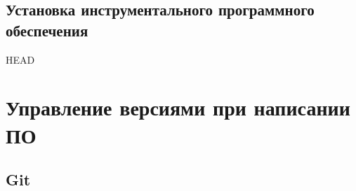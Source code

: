 

\section{Установка инструментального программного обеспечения}

HEAD






\chapter{Управление версиями при написании ПО}

\section{Git}\label{git}\cite{progit}
